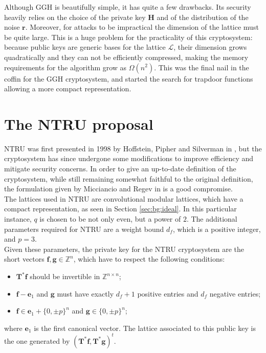 Although GGH is beautifully simple, it has quite a few drawbacks. Its security heavily relies on the choice of the private key $\mathbf{H}$ and of the distribution of the noise $\mathbf{r}$. Moreover, for attacks to be impractical the dimension of the lattice must be quite large. This is a huge problem for the practicality of this cryptosystem: because public keys are generic bases for the lattice $\mathscr{L}$, their dimension grows quadratically and they can not be efficiently compressed, making the memory requirements for the algorithm grow as $\Omega(n^2)$. This was the final nail in the coffin for the GGH cryptosystem, and started the search for trapdoor functions allowing a more compact representation.

\section{The NTRU proposal}
NTRU was first presented in 1998 by Hoffstein, Pipher and Silverman in \cite{NTRU}, but the cryptosystem has since undergone some modifications to improve efficiency and mitigate security concerns. In order to give an up-to-date definition of the cryptosystem, while still remaining somewhat faithful to the original definition, the formulation given by Micciancio and Regev in \cite{PQC} is a good compromise.\\
The lattices used in NTRU are convolutional modular lattices, which have a compact representation, as seen in Section \ref{sec:bg:ideal}. In this particular instance, $q$ is chosen to be not only even, but a power of $2$. The additional parameters required for NTRU are a weight bound $d_f$, which is a positive integer, and $p=3$.\\
Given these parameters, the private key for the NTRU cryptosystem are the short vectors $\mathbf{f},\mathbf{g}\in\mathbb{Z}^{n}$, which have to respect the following conditions:
\begin{itemize}
\item $\mathbf{T}^*\mathbf{f}$ should be invertible in $\mathbb{Z}^{n\times n}$;
\item $\mathbf{f}-\mathbf{e}_1$ and $\mathbf{g}$ must have exactly $d_f+1$ positive entries and $d_f$ negative entries;
\item $\mathbf{f}\in\mathbf{e}_1+\{0,\pm p\}^n$ and $\mathbf{g}\in\{0,\pm p\}^n$;
\end{itemize}
where $\mathbf{e}_1$ is the first canonical vector.
\sloppy The lattice associated to this public key is the one generated by $(\mathbf{T}^*\mathbf{f},\mathbf{T}^*\mathbf{g})^t$.\\
